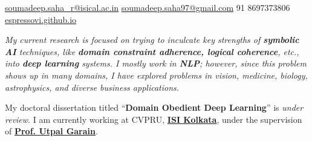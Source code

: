 \documentclass[10pt,a4paper]{article}
\begin{document}
\sloppy


\nobreakvspace{0.3em}

\noindent\href{mailto:soumadeep.saha\_r@isical.ac.in}{soumadeep.saha\_r@isical.ac.in}\sbull
\noindent\href{mailto:soumadeep.saha97@gmail.com}{soumadeep.saha97@gmail.com}\sbull
\textsmaller{+}91 8697373806\sbull
\href{https://espressovi.github.io}{espressovi.github.io}

\spacedhrule{0.9em}{-0.4em}


\vspace{-0.2em}
    \emph{My current research is focused on trying to inculcate key strengths of
    \textbf{symbolic AI} techniques, like \textbf{domain constraint adherence,
    logical coherence}, etc., into \textbf{deep learning} systems. I mostly work in
    \textbf{NLP}; however, since this problem shows up in many domains, I have
    explored problems in vision, medicine, biology, astrophysics, and diverse
    business applications.}
    
    My doctoral dissertation titled ``\textbf{Domain Obedient Deep Learning}''
    is \emph{under review}. I am currently working at CVPRU,
    \href{https://www.isical.ac.in/}{\textbf{ISI Kolkata}}, under the
    supervision of \textbf{\href{https://www.isical.ac.in/~utpal}{Prof. Utpal Garain}}.

\spacedhrule{1em}{-0.7em}

\end{document}
